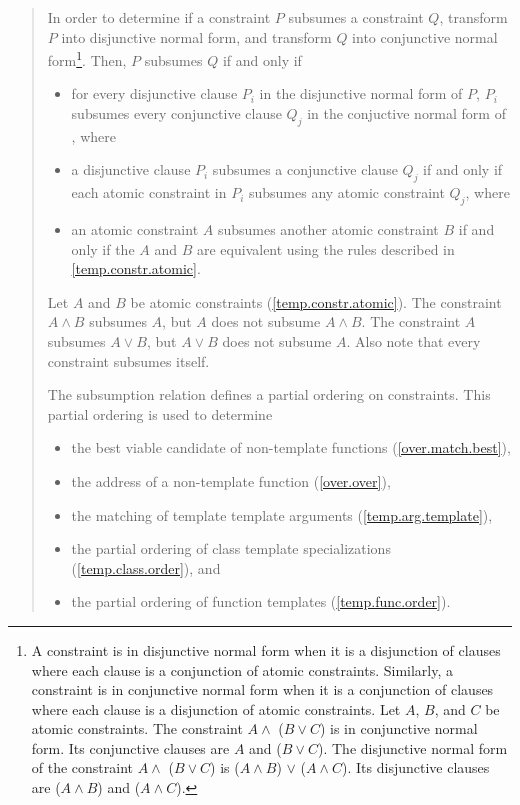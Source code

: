 \begin{quote}
\begin{addedblock}
\pnum
In order to determine if a constraint $P$ subsumes a constraint
$Q$, transform $P$ into disjunctive normal form, 
and transform $Q$ into conjunctive normal form\footnote{
A constraint is in disjunctive normal form when it is a disjunction of
clauses where each clause is a conjunction of atomic constraints. 
% 
Similarly, a constraint is in conjunctive normal form when it is a conjunction 
of clauses where each clause is a disjunction of atomic constraints.
% 
\enterexample
Let $A$, $B$, and $C$ be atomic constraints.
% 
The constraint $A \land$ ($B \lor C$) is in 
conjunctive normal form.
% 
Its conjunctive clauses are $A$ and ($B \lor C$).
% 
The disjunctive normal form of the constraint
$A \land$ ($B \lor C$) 
is
($A \land B$) $\lor$ ($A \land C$).
% 
Its disjunctive clauses are ($A \land B$) and 
($A \land C$).
\exitexample
}.
% 
Then, $P$ subsumes $Q$ if and only if
\begin{itemize}
\item for every disjunctive clause $P_i$ in the disjunctive normal 
form of $P$, $P_i$ subsumes every conjunctive clause $Q_j$ 
in the conjuctive normal form of , where

\item a disjunctive clause $P_i$ subsumes a conjunctive clause
$Q_j$ if and only if each atomic constraint in $P_i$ subsumes 
any atomic constraint $Q_j$, where

\item an atomic constraint $A$ subsumes another atomic constraint
$B$ if and only if the $A$ and $B$ are equivalent using the
rules described in \ref{temp.constr.atomic}.
\end{itemize}
% 
\enterexample
Let $A$ and $B$ be atomic constraints (\ref{temp.constr.atomic}).
% 
The constraint $A \land B$ subsumes $A$, but $A$ does not subsume $A \land B$.
% 
The constraint $A$ subsumes $A \lor B$, but $A \lor B$ does not subsume $A$.
% 
Also note that every constraint subsumes itself.
\exitexample


\pnum
The subsumption relation defines a partial ordering on constraints. 
This partial ordering is used to determine
% 
\begin{itemize}
\item the best viable candidate of non-template functions
     (\ref{over.match.best}), 
\item the address of a non-template function
     (\ref{over.over}), 
\item the matching of template template arguments
     (\ref{temp.arg.template}), 
\item the partial ordering of class template specializations
     (\ref{temp.class.order}), and
\item the partial ordering of function templates
     (\ref{temp.func.order}).
\end{itemize}


\end{addedblock}
\end{quote}
